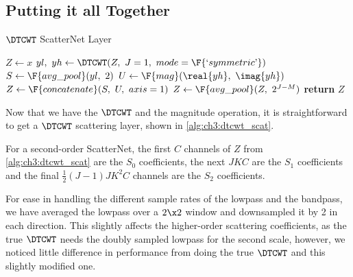 \subsection{Putting it all Together}\label{sec:ch3:combining}

\begin{algorithm}[tb]
  \caption{$\DTCWT$ ScatterNet Layer}
  \label{alg:ch3:dtcwt_scat}
\begin{algorithmic}[1]
\State $Z \gets x$
  \State $yl,\ yh \gets \DTCWT(Z,\ J=1,\ mode=\F{`symmetric \textrm'})$
  \State $S \gets \F{avg\_pool}(yl,\ 2)$
  \State $U \gets \F{mag}(\real{yh},\ \imag{yh})$
  \State $Z \gets \F{concatenate}(S,\ U,\ axis=1)$ 
\EndFor
{}
\State $Z \gets \F{avg\_pool}(Z,\ 2^{J-M})$
\EndIf
\State \textbf{return} $Z$
\EndFunction
\end{algorithmic}
\end{algorithm}
Now that we have the $\DTCWT$ and the magnitude operation, it is straightforward
to get a $\DTCWT$ scattering layer, shown in \autoref{alg:ch3:dtcwt_scat}.

For a second-order ScatterNet, the first $C$ channels of $Z$ from
\autoref{alg:ch3:dtcwt_scat} are the $S_0$ coefficients, the next $JKC$ are the
$S_1$ coefficients and the final $\frac{1}{2}(J-1)JK^2C$ channels are the
$S_2$ coefficients.

For ease in handling the different sample rates of the lowpass and the
bandpass, we have averaged the lowpass over a $2\x 2$ window and downsampled it
by 2 in each direction. This slightly
affects the higher-order scattering coefficients, as the true $\DTCWT$ needs the doubly
sampled lowpass for the second scale, however, we noticed little difference in
performance from doing the true $\DTCWT$ and this slightly modified one.

